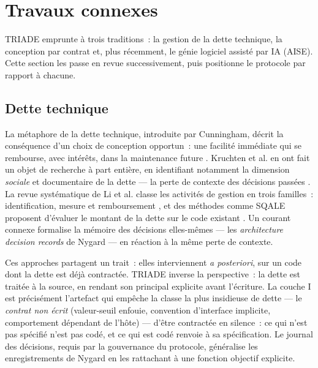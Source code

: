 \section{Travaux connexes}\label{sec:connexes}

TRIADE emprunte à trois traditions~: la gestion de la dette technique, la
conception par contrat et, plus récemment, le génie logiciel assisté par IA
(AISE). Cette section les passe en revue successivement, puis positionne le
protocole par rapport à chacune.

\subsection{Dette technique}\label{sec:connexes-dette}

La métaphore de la dette technique, introduite par Cunningham, décrit la
conséquence d’un choix de conception opportun~: une facilité immédiate qui se
rembourse, avec intérêts, dans la maintenance future \cite{cunningham1992}.
Kruchten et al. en ont fait un objet de recherche à part entière, en
identifiant notamment la dimension \emph{sociale} et documentaire de la dette
— la perte de contexte des décisions passées \cite{kruchten2012}. La revue
systématique de Li et al. classe les activités de gestion en trois
familles~: identification, mesure et remboursement \cite{li2015}, et des
méthodes comme SQALE proposent d’évaluer le montant de la dette sur le code
existant \cite{letouzey2012}. Un courant connexe formalise la mémoire des
décisions elles-mêmes — les \emph{architecture decision records} de Nygard
\cite{nygard2011} — en réaction à la même perte de contexte.

Ces approches partagent un trait~: elles interviennent \emph{a posteriori},
sur un code dont la dette est déjà contractée. TRIADE inverse la perspective~:
la dette est traitée à la source, en rendant son principal explicite avant
l’écriture. La couche I est précisément l’artefact qui empêche la classe la
plus insidieuse de dette — le \emph{contrat non écrit} (valeur-seuil enfouie,
convention d’interface implicite, comportement dépendant de l’hôte) — d’être
contractée en silence~: ce qui n’est pas spécifié n’est pas codé, et ce qui
est codé renvoie à sa spécification. Le journal des décisions, requis par la
gouvernance du protocole, généralise les enregistrements de Nygard en les
rattachant à une fonction objectif explicite.

